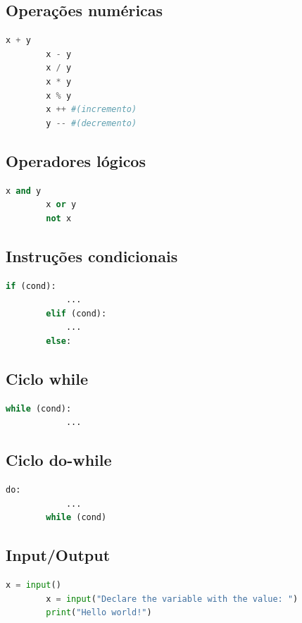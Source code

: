 \documentclass[11pt,a4paper]{report}
\begin{document}
    \subsection{Operações numéricas}
    \begin{lstlisting}[language=Python]
        x + y
        x - y
        x / y
        x * y
        x % y
        x ++ #(incremento)
        y -- #(decremento)
    \end{lstlisting}

    \subsection{Operadores lógicos}
    \begin{lstlisting}[language=Python]
        x and y
        x or y
        not x
    \end{lstlisting}

    \subsection{Instruções condicionais}
    \begin{lstlisting}[language=Python]
        if (cond):
            ...
        elif (cond):
            ...
        else:
    \end{lstlisting}

    \subsection{Ciclo while}
    \begin{lstlisting}[language=Python]
        while (cond):
            ...
    \end{lstlisting}

    \subsection{Ciclo do-while}
    \begin{lstlisting}[language=Python]
        do:
            ...
        while (cond)
    \end{lstlisting}

    \subsection{Input/Output}
    \begin{lstlisting}[language=Python]
        x = input()
        x = input("Declare the variable with the value: ")
        print("Hello world!")
    \end{lstlisting}
\end{document}
